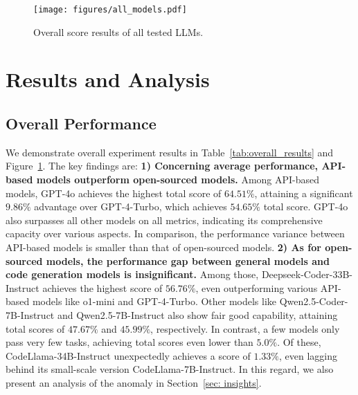 \begin{figure}[t!]
    \centering
    \texttt{[image: figures/all\_models.pdf]}
    \vspace{-0.3cm}
    \caption{Overall score results of all tested LLMs.}
    \vspace{-0.3cm}
    \label{fig: final_evaluation}
\end{figure}

\section{Results and Analysis}

\subsection{Overall Performance}

We demonstrate overall experiment results in Table~\ref{tab:overall_results} and Figure~\ref{fig: final_evaluation}. The key findings are: \textbf{1) Concerning average performance, API-based models outperform open-sourced models.} Among API-based models, GPT-4o achieves the highest total score of $64.51\%$, attaining a significant $9.86\%$ advantage over GPT-4-Turbo, which achieves $54.65\%$ total score. GPT-4o also surpasses all other models on all metrics, indicating its comprehensive capacity over various aspects. 
In comparison, the performance variance between API-based models is smaller than that of open-sourced models.
\textbf{2) As for open-sourced models, the performance gap between general models and code generation models is insignificant.} Among those, Deepseek-Coder-33B-Instruct achieves the highest score of $56.76\%$, even outperforming various API-based models like o1-mini and GPT-4-Turbo. Other models like Qwen2.5-Coder-7B-Instruct and Qwen2.5-7B-Instruct also show fair good capability, attaining total scores of $47.67\%$ and $45.99\%$, respectively. In contrast, a few models only pass very few tasks, achieving total scores even lower than $5.0\%$. Of these, CodeLlama-34B-Instruct unexpectedly achieves a score of $1.33\%$, even lagging behind its small-scale version CodeLlama-7B-Instruct. In this regard, we also present an analysis of the anomaly in Section~\ref{sec: insights}. 


